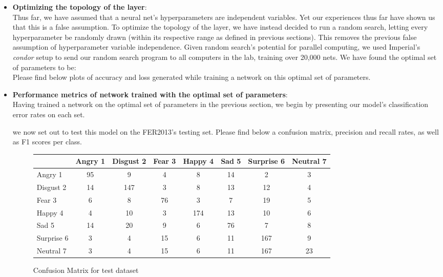 \begin{itemize}[topsep=-10pt]
\item \textbf{Optimizing the topology of the layer}:\\
  Thus far, we have assumed that a neural net's hyperparameters are independent variables.
  Yet our experiences thus far have shown us that this is a false assumption.
  To optimize the topology of the layer, we have instead decided to run a random search,
  letting every hyperparameter be randomly drawn (within its respective range as defined in previous sections).
  This removes the previous false assumption of hyperparameter variable independence.
  Given random search's potential for parallel computing, we used Imperial's \emph{condor} setup to send our random search program
  to all computers in the lab, training over 20,000 nets.
  We have found the optimal set of parameters to be:\\
  Please find below plots of accuracy and loss generated
  while training a network on this optimal set of parameters.

  
\item \textbf{Performance metrics of network trained with the optimal set of parameters}:\\
  Having trained a network on the optimal set of parameters in the previous section,
  we begin by presenting our model's classification error rates on each set.
  
  we now set out to test this model on the FER2013's testing set.
  Please find below a confusion matrix, precision and recall rates, as well as F1 scores per class.
  \begin{figure}[h]
  \begin{center}
    \caption{Confusion Matrix for test dataset}
    \begin{tabular}{ | l || c | c | c | c | c | c | c |}
    \hline
          & Angry 1 & Disgust 2 & Fear 3 & Happy 4 & Sad 5 & Surprise 6 & Neutral 7 \\ \hline \hline
        Angry 1 & 95 & 9 & 4 & 8 & 14 & 2 & 3 \\ \hline
        Disgust 2 & 14 & 147 & 3 & 8 & 13 & 12 & 4 \\ \hline
        Fear 3 & 6 & 8 & 76 & 3 & 7 & 19 & 5\\ \hline
        Happy 4 & 4 & 10 & 3 & 174 & 13 & 10 & 6 \\ \hline
        Sad 5 & 14 & 20 & 9 & 6 & 76 & 7 & 8\\ \hline
        Surprise 6 & 3 & 4 & 15 & 6 & 11 & 167 & 9 \\ \hline
        Neutral 7 & 3 & 4 & 15 & 6 & 11 & 167  & 23\\ \hline
    \end{tabular}
    \label{fig:confusionMatrix}
\end{center}
\end{figure}



\end{itemize}
